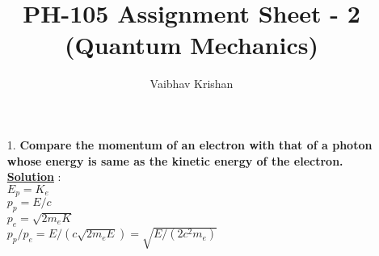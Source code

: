\documentclass[10pt, a4paper]{article}
\begin{document}
	\title{PH-105 Assignment Sheet - 2 (Quantum Mechanics)}
	\date{}
	\author{Vaibhav Krishan}
	\maketitle
	\newcommand{\angstrom}{\mbox{\normalfont\AA}}
	\begin{enumerate}
		\item[1.] {\bf Compare the momentum of an electron with that of a photon whose energy is
same as the kinetic energy of the electron.}\\
		{\underline {\bf Solution}} :\\
		\begin{math} E_{p} = K_e \end{math}\\
		\begin{math} p_p = E/c\end{math}\\
		\begin{math} p_e = \sqrt{2m_eK}\end{math}\\
		\begin{math} p_p/p_e = E/(c\sqrt{2m_eE}) = \sqrt{E/(2c^2m_e)}\end{math}\\
	\end{enumerate}
\end{document}
